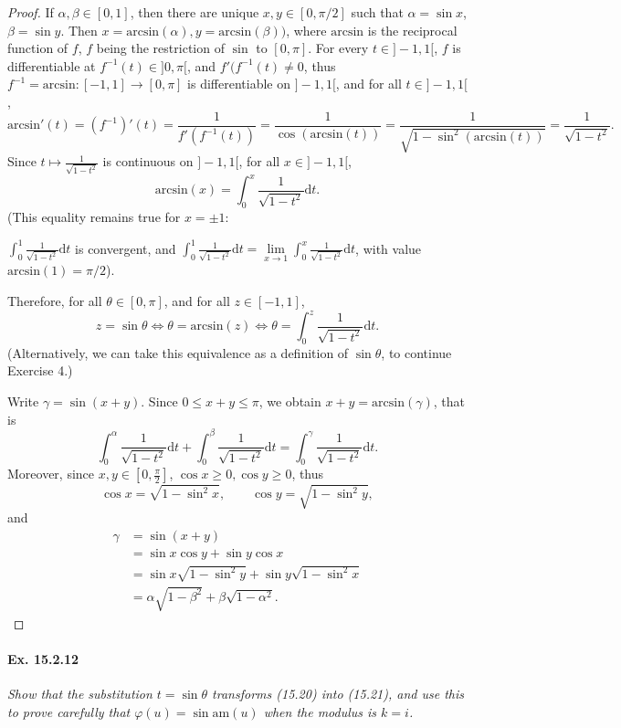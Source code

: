 \documentclass[11pt,a4paper]{article}
\newcommand{\D}{\mathrm{d}}
\begin{document}
\begin{proof} If $\alpha, \beta \in [0,1]$, then there are unique $x,y \in [0,\pi/2]$ such that $\alpha = \sin x$, $\beta = \sin y$. Then $x = \mathrm{arcsin}(\alpha), y = \mathrm{arcsin}(\beta))$, where $\mathrm{arcsin}$ is the reciprocal function of $f$, $f$ being the restriction of $\sin$ to $[0,\pi]$. For every $t \in ]-1,1[$, $f$ is differentiable at $f^{-1}(t) \in ]0,\pi[$, and $f'(f^{-1}(t) \ne 0$, thus $f^{-1} = \mathrm{arcsin} :[-1,1] \to [0,\pi]$ is differentiable on $]-1,1[$, and for all $t \in ]-1,1[$,
$$\mathrm{arcsin}'(t) = (f^{-1})'(t) = \frac{1}{f'(f^{-1}(t))} = \frac{1}{\cos( \mathrm{arcsin}(t))} = \frac{1}{\sqrt{1 - \sin^2(\mathrm{arcsin}(t))}} = \frac{1}{\sqrt{1 -t^2}}.$$
Since $t \mapsto  \frac{1}{\sqrt{1-t^2}}$ is continuous on $]-1,1[$, for all $x \in ]-1,1[$,
$$\mathrm{arcsin}(x) = \int_0^x  \frac{1}{\sqrt{1-t^2}} \D t.$$
(This equality remains true for $x = \pm 1$: 

$\int_0^1  \frac{1}{\sqrt{1-t^2}} \D t$ is convergent, and $ \int_0^1  \frac{1}{\sqrt{1-t^2}} \D t = \lim\limits_{x \to 1} \int_0^x  \frac{1}{\sqrt{1-t^2}} \D t$, with value $\mathrm{arcsin}(1) = \pi/2$).

Therefore, for all $\theta \in [0,\pi]$, and for all $z \in [-1,1]$,
$$  z = \sin \theta \iff  \theta= \mathrm{arcsin}(z) \iff \theta = \int_0^z  \frac{1}{\sqrt{1-t^2}} \D t.$$
(Alternatively, we can take this equivalence as a definition of $\sin \theta$, to continue Exercise 4.)

Write $\gamma =\sin(x+y)$. Since $0 \leq x+y \leq \pi$, we obtain $x+y =\mathrm{arcsin}(\gamma)$, that is
$$\int_0^\alpha \frac{1}{\sqrt{1-t^2}} \D t + \int_0^\beta \frac{1}{\sqrt{1-t^2}} \D t = \int_0^\gamma \frac{1}{\sqrt{1-t^2}} \D t.$$
Moreover, since $x,y \in [0,\frac{\pi}{2}]$, $\cos x \geq 0, \cos y \geq 0$, thus 
$$\cos x = \sqrt{1- \sin^2 x}, \qquad \cos y = \sqrt{1-\sin^2 y},$$
and
\begin{align*}
\gamma &= \sin(x+y)\\
&=\sin x \cos y + \sin y \cos x\\
&=\sin x \sqrt{1-\sin^2 y}+ \sin y \sqrt{1-\sin^2 x}\\
&=  \alpha \sqrt{1-\beta^2} + \beta \sqrt{1- \alpha^2}.
\end{align*}
\end{proof}

\paragraph{Ex. 15.2.12}{\it Show that the substitution $t = \sin \theta$ transforms (15.20) into (15.21), and use this to prove carefully that $\varphi(u) = \sin \mathrm{am}(u)$ when the modulus is $k = i$.
}
\end{document}

